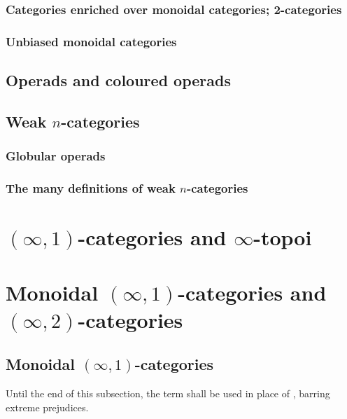        \subsubsection{Categories enriched over monoidal categories; 2-categories}
        
        \subsubsection{Unbiased monoidal categories}
    
    \subsection{Operads and coloured operads}
    
    \subsection{Weak \texorpdfstring{$n$}{}-categories}
        \subsubsection{Globular operads}
        
        \subsubsection{The many definitions of weak \texorpdfstring{$n$}{}-categories}
        
\section{\texorpdfstring{$(\infty, 1)$}{}-categories and \texorpdfstring{$\infty$}{}-topoi}

\section{Monoidal \texorpdfstring{$(\infty, 1)$}{}-categories and \texorpdfstring{$(\infty, 2)$}{}-categories}
    \subsection{Monoidal \texorpdfstring{$(\infty, 1)$}{}-categories}
        \begin{convention}
            Until the end of this subsection, the term  shall be used in place of , barring extreme prejudices.
        \end{convention}
    
